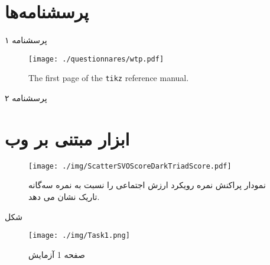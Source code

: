     
\let\Chapter\chapter
    
\chapter{پرسشنامه‌ها}
\label{app:questionnaires}
پرسشنامه ۱
% 
% 
\begin{figure}[htpb]
    \centering
    \texttt{[image: ./questionnares/wtp.pdf]}
    \caption{The first page of the \texttt{tikz} reference manual.}
    \label{fig:tikzpgf}
\end{figure}
پرسشنامه ۲


\chapter{ابزار مبتنی بر وب}
\begin{figure}[htpb]
    \centering
    \texttt{[image: ./img/ScatterSVOScoreDarkTriadScore.pdf]}
    \caption{نمودار پراکنش نمره رویکرد ارزش اجتماعی را نسبت به نمره سه‌گانه تاریک نشان می دهد. }
    \label{fig:ScatterSVOScoreDarkTriadScore}
\end{figure}
شکل 
\label{fig:sexualityAndSVOAgainstPopulation}



\begin{figure}[htpb]
\centering
\texttt{[image: ./img/Task1.png]}
\caption{ صفحه 1 آزمایش }
\label{fig:Task1}
\end{figure}
 
